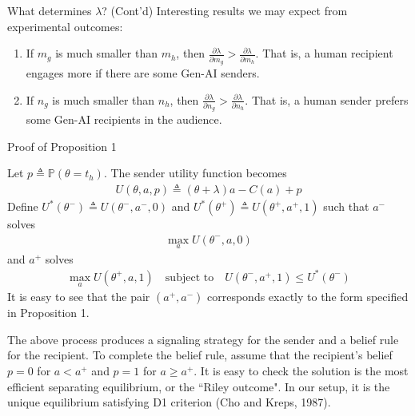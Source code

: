 \documentclass[9pt,aspectratio=1610]{beamer}
\begin{document}
\begin{frame}{What determines $\lambda$? (Cont'd)}
Interesting results we may expect from experimental outcomes:

\begin{enumerate}
    \item If $m_g$ is much smaller than $m_h$, then $\frac{\partial\lambda}{\partial m_g}>\frac{\partial\lambda}{\partial m_h}$. That is, a human recipient engages more if there are some Gen-AI senders.
    \item If $n_g$ is much smaller than $n_h$, then $\frac{\partial\lambda}{\partial n_g}>\frac{\partial\lambda}{\partial n_h}$. That is, a human sender prefers some Gen-AI recipients in the audience.
\end{enumerate}

\end{frame}






\begin{frame}{Proof of Proposition 1}\label{proof_prop1}

Let $p\triangleq \mathbb{P}(\theta=t_h)$. The sender utility function becomes
\begin{align*}
    U(\theta,a,p)  \triangleq (\theta+\lambda)a-C(a)+p
\end{align*}
Define $U^*(\theta^-) \triangleq U(\theta^-,a^-,0)$ and $U^*(\theta^+) \triangleq U(\theta^+,a^+,1)$ such that $a^-$ solves 
\begin{align*}
    \max_{a} U(\theta^-,a,0)
\end{align*}
and $a^+$ solves
\begin{align*}
    \max_{a} U(\theta^+,a,1)\quad \text{subject to} \quad U(\theta^-,a^+,1)\leq U^*(\theta^-)
\end{align*}
It is easy to see that the pair $(a^+,a^-)$ corresponds exactly to the form specified in Proposition 1.
\vspace{1em}

The above process produces a signaling strategy for the sender and a belief rule for the recipient. To complete the belief rule, assume that the recipient's belief $p = 0$ for $a<a^+$ and $p=1$ for $a\geq a^+$. It is easy to check the solution is the most efficient separating equilibrium, or the ``Riley outcome". In our setup, it is the unique equilibrium satisfying D1 criterion (Cho and Kreps, 1987). 
\end{frame}
\end{document}
